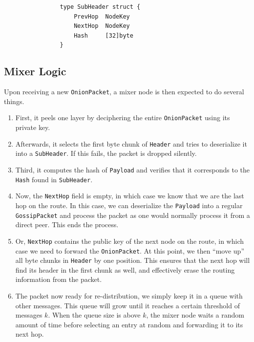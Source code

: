 \documentclass[11pt, a4paper]{article}
\begin{document}
            \begin{lstlisting}
                type SubHeader struct {
                    PrevHop  NodeKey
                    NextHop  NodeKey
                    Hash     [32]byte
                }
            \end{lstlisting}

            \subsection{Mixer Logic}\label{subsec:mixer-logic}

            Upon receiving a new \texttt{OnionPacket}, a mixer node is then expected to do several things.

            \begin{enumerate}
                \item First, it peels one layer by deciphering the entire \texttt{OnionPacket} using its private key.

                \item Afterwards, it selects the first byte chunk of \texttt{Header} and tries to deserialize it into a \texttt{SubHeader}. If this fails, the packet is dropped silently.

                \item Third, it computes the hash of \texttt{Payload} and verifies that it corresponds to the \texttt{Hash} found in \texttt{SubHeader}.

                \item Now,  the \texttt{NextHop} field is empty, in which case we know that we are the last hop on the route.
                In this case, we can deserialize the \texttt{Payload} into a regular \texttt{GossipPacket} and process the packet as one would normally process it from a direct peer. This ends the process.
                \item Or, \texttt{NextHop} contains the public key of the next node on the route, in which case we need to forward the \texttt{OnionPacket}.
                At this point, we then ``move up'' all byte chunks in \texttt{Header} by one position.
                This ensures that the next hop will find its header in the first chunk as well, and effectively erase the routing information from the packet.
                \item The packet now ready for re-distribution, we simply keep it in a queue with other messages.
                This queue will grow until it reaches a certain threshold of messages $k$.
                When the queue size is above $k$, the mixer node waits a random amount of time before selecting an entry at random and forwarding it to its next hop.

            \end{enumerate}
\end{document}
